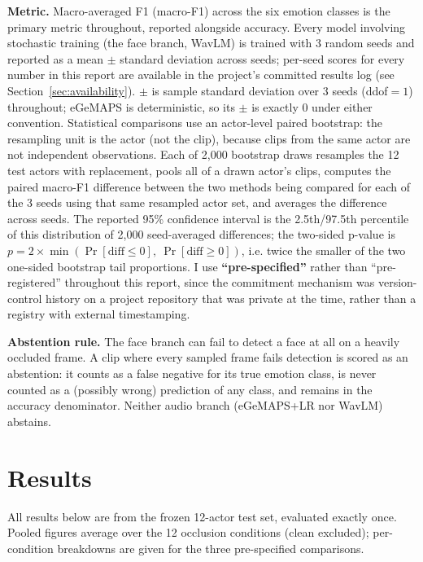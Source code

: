 \documentclass[10pt]{article}
\begin{document}
\textbf{Metric.} Macro-averaged F1 (macro-F1) across the six emotion classes is the primary metric throughout,
reported alongside accuracy. Every model involving stochastic training (the face branch, WavLM) is
trained with 3 random seeds and reported as a mean $\pm$ standard deviation across seeds; per-seed scores for
every number in this report are available in the project's committed results log (see Section~\ref{sec:availability}).
$\pm$ is sample standard deviation over 3 seeds (ddof$=1$) throughout; eGeMAPS is deterministic, so
its $\pm$ is exactly 0 under either convention.
Statistical comparisons use an actor-level paired bootstrap: the resampling unit is the actor (not
the clip), because clips from the same actor are not independent observations. Each of 2,000 bootstrap
draws resamples the 12 test actors with replacement, pools all of a drawn actor's clips, computes the
paired macro-F1 difference between the two methods being compared for each of the 3 seeds using that same
resampled actor set, and averages the difference across seeds. The reported 95\% confidence interval is
the 2.5th/97.5th percentile of this distribution of 2,000 seed-averaged differences; the two-sided
p-value is $p = 2 \times \min(\Pr[\text{diff} \le 0],\ \Pr[\text{diff} \ge 0])$, i.e. twice the smaller of
the two one-sided bootstrap tail proportions. I use \textbf{``pre-specified''} rather than ``pre-registered''
throughout this report, since the commitment mechanism was version-control history on a project
repository that was private at the time, rather than a registry with external timestamping.

\textbf{Abstention rule.} The face branch can fail to detect a face at all on a heavily occluded frame. A
clip where every sampled frame fails detection is scored as an abstention: it counts as a false negative
for its true emotion class, is never counted as a (possibly wrong) prediction of any class, and remains
in the accuracy denominator. Neither audio branch (eGeMAPS+LR nor WavLM) abstains.

\section{Results}
\label{sec:results}

All results below are from the frozen 12-actor test set, evaluated exactly once. Pooled figures average
over the 12 occlusion conditions (clean excluded); per-condition breakdowns are given for the three
pre-specified comparisons.
\end{document}
